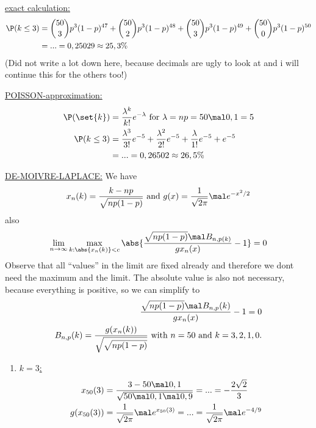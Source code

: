 \subsection{}
\begin{solution}
	\item  \ul{exact calculation:} 
	\begin{align*}
		\P(k \le 3) &= \binom{50}{3}p^3(1-p)^{47} + \binom{50}{2}p^3(1-p)^{48} + \binom{50}{3}p^3(1-p)^{49} + \binom{50}{0}p^3(1-p)^{50}\\
		&= ... = 0,25029 \approx 25,3\%
	\end{align*}
	(Did not write a lot down here, because decimals are ugly to look at and i will continue this for the others too!)
	\item \ul{POISSON-approximation:}
	\begin{align*}
		\P(\set{k}) &= \frac{\lambda^k}{k!}e^{-\lambda} \for \lambda = np = 50\mal 0,1 = 5\\
		\P(k \le 3) &= \frac{\lambda^3}{3!}e^{-5} + \frac{\lambda^2}{2!}e^{-5} + \frac{\lambda}{1!}e^{-5} + e^{-5}\\
		&= ... = 0,26502 \approx 26,5\%
	\end{align*}
	\item \ul{DE-MOIVRE-LAPLACE:} We have
	\begin{align*}
		x_n(k) = \frac{k-np}{\sqrt{np(1-p)}} \and g(x) = \frac{1}{\sqrt{2\pi}}\mal e^{-x^2/2}
	\end{align*}
	also
	\begin{align*}
		\lim_{n \to \infty} \max_{k:\abs{x_n(k)}<c} \abs{\frac{\sqrt{np(1-p)}\mal B_{n,p(k)}}{g{x_n}(x)} -1} = 0
	\end{align*}
	Observe that all ``values'' in the limit are fixed already and therefore we dont need the maximum and the limit. The absolute value is also not necessary, because everything is positive, so we can simplify to
	\begin{align*}
		\frac{\sqrt{np(1-p)}\mal B_{n,p}(k)}{g{x_n}(x)} -1 = 0\\
		B_{n,p}(k) = \frac{g(x_n(k))}{\sqrt{\sqrt{np(1-p)}}} \with n=50 \and k = 3,2,1,0.
	\end{align*}
	\begin{enumerate}[label=]
		\item \ul{$k=3$:}
		\begin{align*}
			x_{50}(3) &= \frac{3-50\mal 0,1}{\sqrt{50\mal 0,1 \mal 0,9}} = ... = -\frac{2\sqrt{2}}{3}\\
			g(x_{50}(3)) &= \frac{1}{\sqrt{2\pi}}\mal e^{x_{50}(3)} = ... = \frac{1}{\sqrt{2\pi}} \mal e^{-4/9}

\end{align*}
\end{enumerate}
\end{solution}

